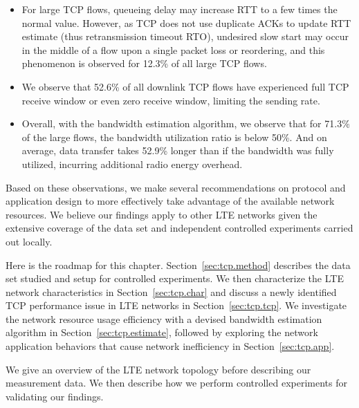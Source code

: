 \begin{itemize}
\item For large TCP flows, queueing delay may increase RTT to a few times the normal value. However, as TCP does not use duplicate ACKs to update RTT estimate (thus retransmission timeout RTO), undesired slow start may occur in the middle of a flow upon a single packet loss or reordering, and this phenomenon is observed for 12.3\% of all large TCP flows.
\item We observe that 52.6\% of all downlink TCP flows have experienced full TCP receive window or even zero receive window, limiting the sending rate.
\item Overall, with the bandwidth estimation algorithm, we observe that for 71.3\% of the large flows, the bandwidth utilization ratio
is below 50\%. And on average, data transfer takes 52.9\% longer than if the bandwidth was fully utilized, incurring additional radio energy overhead.
\end{itemize}

Based on these observations, we make several recommendations on protocol and application design to more effectively take
advantage of the available network resources. We believe our findings apply to other LTE networks given the extensive coverage of the data set and independent controlled experiments carried out locally.

Here is the roadmap for this chapter. Section~\ref{sec:tcp.method} describes the data set studied and setup for controlled experiments. We then characterize the LTE network characteristics in Section~\ref{sec:tcp.char} and discuss a newly identified TCP performance issue in LTE networks in Section~\ref{sec:tcp.tcp}. We investigate the network resource usage efficiency with a devised bandwidth estimation algorithm in Section~\ref{sec:tcp.estimate}, followed by exploring the network application behaviors that cause network inefficiency in Section~\ref{sec:tcp.app}.


\label{sec:tcp.method}

We give an overview of the LTE network topology before describing our measurement data. We then describe how we perform controlled experiments for validating our findings.

\label{sec:tcp.data}


\begin{figure}[t]
\centering
{}\\
\label{fig:tcp.architecture}
\end{figure}


